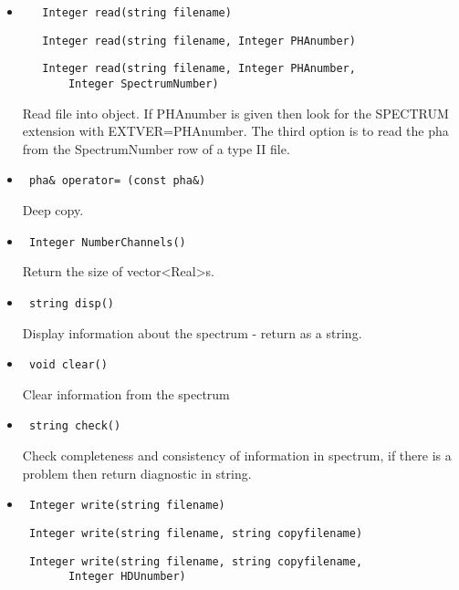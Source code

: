 \documentclass[11pt]{book}
\begin{document}
\begin{itemize}

\item  \begin{verbatim}   Integer read(string filename) \end{verbatim}
       \begin{verbatim}   Integer read(string filename, Integer PHAnumber) \end{verbatim}
       \begin{verbatim}   Integer read(string filename, Integer PHAnumber,
       Integer SpectrumNumber) \end{verbatim}

          Read file into object. If PHAnumber is given then look for
          the SPECTRUM extension with EXTVER=PHAnumber. The third
          option is to read the pha from the SpectrumNumber row of 
          a type II file.

\item  \begin{verbatim} pha& operator= (const pha&) \end{verbatim}

          Deep copy.

\item  \begin{verbatim} Integer NumberChannels() \end{verbatim}

          Return the size of vector<Real>s.

\item  \begin{verbatim} string disp() \end{verbatim}

          Display information about the spectrum - return as a string.

\item  \begin{verbatim} void clear() \end{verbatim}

          Clear information from the spectrum

\item  \begin{verbatim} string check() \end{verbatim}

          Check completeness and consistency of information in spectrum, 
          if there is a problem then return diagnostic in string.

\item  \begin{verbatim} Integer write(string filename) \end{verbatim}
       \begin{verbatim} Integer write(string filename, string copyfilename) \end{verbatim}
       \begin{verbatim} Integer write(string filename, string copyfilename,
       Integer HDUnumber) \end{verbatim}


\end{itemize}
\end{document}
